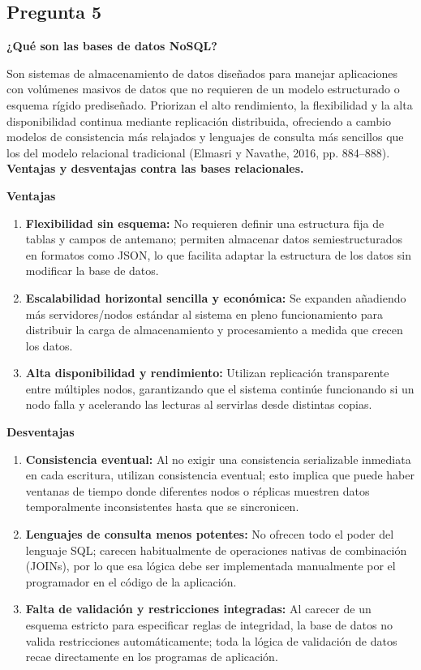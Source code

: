 \subsection*{Pregunta 5}
\textbf{¿Qué son las bases de datos NoSQL?}

Son sistemas de almacenamiento de datos diseñados para manejar aplicaciones con volúmenes masivos de datos que no requieren de un modelo estructurado o esquema rígido prediseñado. Priorizan el alto rendimiento, la flexibilidad y la alta disponibilidad continua mediante replicación distribuida, ofreciendo a cambio modelos de consistencia más relajados y lenguajes de consulta más sencillos que los del modelo relacional tradicional (Elmasri y Navathe, 2016, pp. 884--888).\\

\textbf{Ventajas y desventajas contra las bases relacionales.}

\textbf{Ventajas}
\begin{enumerate}
    \item \textbf{Flexibilidad sin esquema:} No requieren definir una estructura fija de tablas y campos de antemano; permiten almacenar datos semiestructurados en formatos como JSON, lo que facilita adaptar la estructura de los datos sin modificar la base de datos.
    
    \item \textbf{Escalabilidad horizontal sencilla y económica:} Se expanden añadiendo más servidores/nodos estándar al sistema en pleno funcionamiento para distribuir la carga de almacenamiento y procesamiento a medida que crecen los datos.

    \item \textbf{Alta disponibilidad y rendimiento:} Utilizan replicación transparente entre múltiples nodos, garantizando que el sistema continúe funcionando si un nodo falla y acelerando las lecturas al servirlas desde distintas copias.
\end{enumerate}

\textbf{Desventajas}
\begin{enumerate}
    \item \textbf{Consistencia eventual:} Al no exigir una consistencia serializable inmediata en cada escritura, utilizan consistencia eventual; esto implica que puede haber ventanas de tiempo donde diferentes nodos o réplicas muestren datos temporalmente inconsistentes hasta que se sincronicen.
    \item \textbf{Lenguajes de consulta menos potentes:} No ofrecen todo el poder del lenguaje SQL; carecen habitualmente de operaciones nativas de combinación (JOINs), por lo que esa lógica debe ser implementada manualmente por el programador en el código de la aplicación.
    \item \textbf{Falta de validación y restricciones integradas:} Al carecer de un esquema estricto para especificar reglas de integridad, la base de datos no valida restricciones automáticamente; toda la lógica de validación de datos recae directamente en los programas de aplicación.
\end{enumerate}